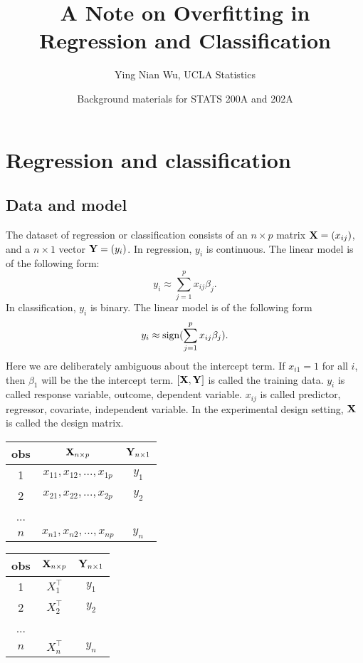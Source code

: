 \documentclass[11pt]{article}
\title{A  Note on Overfitting in Regression and Classification}
\author{Ying Nian Wu, UCLA Statistics}
\date{Background materials for STATS 200A and 202A}
\def\T{{\top}}
\def\T{{\top}}
\def\X{{\bf X}}
\def\Y{{\bf Y}}
\begin{document}
 
\maketitle
 
\tableofcontents

\section{Regression and classification}

\subsection{Data and model} 

The dataset of  regression or classification consists of an $n \times p$ matrix $\X = (x_{ij})$, and a $n \times 1$ vector $\Y = (y_i)$.  In regression, $y_i$ is continuous. The  linear model is of the following form: 
\[
    y_i \approx  \sum_{j = 1}^{p} x_{ij} \beta_j. 
\]
In classification, $y_i$ is binary. The linear model is of the following form
\[
   y_i \approx {\rm sign}(\sum_{j = 1}^{p} x_{ij} \beta_j).
\]
Here we are deliberately ambiguous about the intercept term. If $x_{i1} = 1$ for all $i$, then $\beta_1$ will be the the intercept term. $[\X, \Y]$ is called the training data. $y_i$ is called response variable, outcome, dependent variable. $x_{ij}$ is called predictor, regressor, covariate, independent variable. In the experimental design setting, $\X$ is called the design matrix. 

\begin{table}[h]
\centering
\begin{tabular}{|c|c|c|}
\hline
 obs & $\X_{n\times p}$ & $\Y_{n\times 1}$ \\
\hline\hline
 1   & $x_{11}, x_{12}, ..., x_{1p}$         & $y_1$ \\
 2   & $x_{21}, x_{22}, ..., x_{2p}$         & $y_2$ \\
...  &                 &\\
$n$  &  $x_{n1}, x_{n2}, ..., x_{np}$        & $y_n$ \\
\hline
\end{tabular}
\end{table}

\begin{table}[h]
\centering
\begin{tabular}{|c|c|c|}
\hline
 obs & $\X_{n\times p}$ & $\Y_{n\times 1}$ \\
\hline\hline
 1   & $X_1^\T$         & $y_1$ \\
 2   & $X_2^\T$         & $y_2$ \\
...  &                 &\\
$n$  &  $X_n^\T$        & $y_n$ \\
\hline
\end{tabular}
\end{table}
\end{document}
